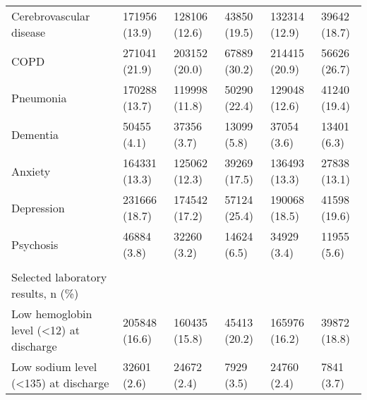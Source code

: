 \begin{adjustbox}{width={\textwidth},totalheight={\textheight},keepaspectratio,frame}
{\begin{tabular}{L{20em}C{10em}C{10em}C{10em}C{10em}C{10em}}
\hspace{3mm}                Cerebrovascular disease &      171956 (13.9) &                 128106 (12.6) &              43850 (19.5) &                  132314 (12.9) &              39642 (18.7) \\
\hspace{3mm}                                   COPD &      271041 (21.9) &                 203152 (20.0) &              67889 (30.2) &                  214415 (20.9) &              56626 (26.7) \\
\hspace{3mm}                             Pneumonia &      170288 (13.7) &                 119998 (11.8) &              50290 (22.4) &                  129048 (12.6) &              41240 (19.4) \\
\hspace{3mm}                              Dementia &        50455 (4.1) &                   37356 (3.7) &               13099 (5.8) &                    37054 (3.6) &               13401 (6.3) \\
\hspace{3mm}                               Anxiety &      164331 (13.3) &                 125062 (12.3) &              39269 (17.5) &                  136493 (13.3) &              27838 (13.1) \\
\hspace{3mm}                            Depression &      231666 (18.7) &                 174542 (17.2) &              57124 (25.4) &                  190068 (18.5) &              41598 (19.6) \\
\hspace{3mm}                             Psychosis &        46884 (3.8) &                   32260 (3.2) &               14624 (6.5) &                    34929 (3.4) &               11955 (5.6) \\
&                 &                            &                        &                             &                        \\
Selected laboratory results, n (\%) &                 &                            &                        &                             &                        \\
\hspace{3mm}   Low hemoglobin level (<12) at discharge &      205848 (16.6) &                 160435 (15.8) &              45413 (20.2) &                  165976 (16.2) &              39872 (18.8) \\
\hspace{3mm}   Low sodium level (<135) at discharge &        32601 (2.6) &                   24672 (2.4) &                7929 (3.5) &                    24760 (2.4) &                7841 (3.7) \\

\end{tabular}}
\end{adjustbox}
